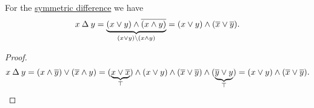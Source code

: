 \begin{lemma}\label{thm:symmetric_difference_outer_meet}
  For the \hyperref[def:symmetric_difference]{symmetric difference} we have
  \begin{equation}\label{eq:thm:symmetric_difference_outer_meet}
    x \symdiff y = \underbrace{(x \vee y) \wedge \oline{(x \wedge y)}}_{(x \vee y) \setminus (x \wedge y)} = (x \vee y) \wedge (\oline x \vee \oline y).
  \end{equation}
\end{lemma}
\begin{proof}
  \begin{equation*}
    x \symdiff y
    =
    (x \wedge \oline y) \vee (\oline x \wedge y)
    =
    (\underbrace{x \vee \oline x}_\top) \wedge (x \vee y) \wedge (\oline x \vee \oline y) \wedge (\underbrace{\oline y \vee y}_\top)
    =
    (x \vee y) \wedge (\oline x \vee \oline y).
  \end{equation*}
\end{proof}

